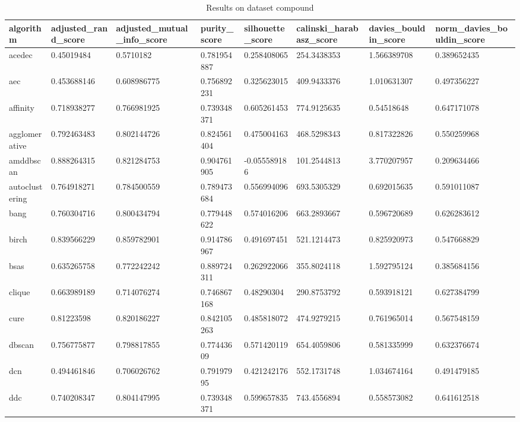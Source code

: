 \begin{table}[H]
\centering
\caption{Results on dataset compound}
\label{tab:params:compound}
\begin{tabular}{|l|l|l|l|l|l|l|l|}
\hline
algorithm & adjusted\_rand\_score & adjusted\_mutual\_info\_score & purity\_score & silhouette\_score & calinski\_harabasz\_score & davies\_bouldin\_score & norm\_davies\_bouldin\_score \\
\hline
acedec & 0.45019484 & 0.5710182 & 0.781954887 & 0.258408065 & 254.3438353 & 1.566389708 & 0.389652435 \\
\hline
aec & 0.453688146 & 0.608986775 & 0.756892231 & 0.325623015 & 409.9433376 & 1.010631307 & 0.497356227 \\
\hline
affinity & 0.718938277 & 0.766981925 & 0.739348371 & 0.605261453 & 774.9125635 & 0.54518648 & 0.647171078 \\
\hline
agglomerative & 0.792463483 & 0.802144726 & 0.824561404 & 0.475004163 & 468.5298343 & 0.817322826 & 0.550259968 \\
\hline
amddbscan & 0.888264315 & 0.821284753 & 0.904761905 & -0.055589186 & 101.2544813 & 3.770207957 & 0.209634466 \\
\hline
autoclustering & 0.764918271 & 0.784500559 & 0.789473684 & 0.556994096 & 693.5305329 & 0.692015635 & 0.591011087 \\
\hline
bang & 0.760304716 & 0.800434794 & 0.779448622 & 0.574016206 & 663.2893667 & 0.596720689 & 0.626283612 \\
\hline
birch & 0.839566229 & 0.859782901 & 0.914786967 & 0.491697451 & 521.1214473 & 0.825920973 & 0.547668829 \\
\hline
bsas & 0.635265758 & 0.772242242 & 0.889724311 & 0.262922066 & 355.8024118 & 1.592795124 & 0.385684156 \\
\hline
clique & 0.663989189 & 0.714076274 & 0.746867168 & 0.48290304 & 290.8753792 & 0.593918121 & 0.627384799 \\
\hline
cure & 0.81223598 & 0.820186227 & 0.842105263 & 0.485818072 & 474.9279215 & 0.761965014 & 0.567548159 \\
\hline
dbscan & 0.756775877 & 0.798817855 & 0.77443609 & 0.571420119 & 654.4059806 & 0.581335999 & 0.632376674 \\
\hline
dcn & 0.494461846 & 0.706026762 & 0.79197995 & 0.421242176 & 552.1731748 & 1.034674164 & 0.491479185 \\
\hline
ddc & 0.740208347 & 0.804147995 & 0.739348371 & 0.599657835 & 743.4556894 & 0.558573082 & 0.641612518 \\

\end{tabular}
\end{table}
